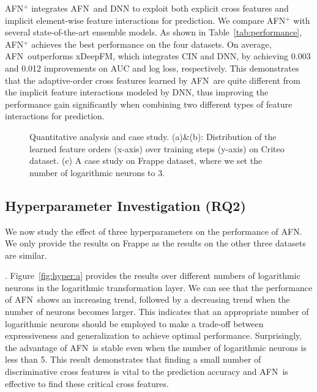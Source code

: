 \documentclass[letterpaper]{article} \usepackage{aaai20}  \usepackage{times}  \usepackage{helvet} \usepackage{courier}  \usepackage[hyphens]{url}  \usepackage{graphicx} \urlstyle{rm} \def\UrlFont{\rm}  \usepackage{graphicx}  \frenchspacing  \setlength{\pdfpagewidth}{8.5in}  \setlength{\pdfpageheight}{11in}
\newcommand{\model}{{AFN}~}
\newcommand{\modelns}{{AFN}}
\begin{document}
\modelns$^+$ integrates \model and DNN to exploit both explicit cross features and implicit element-wise feature interactions for prediction. We compare \modelns$^+$ with several state-of-the-art ensemble models.
As shown in Table~\ref{tab:performance}, \modelns$^+$ achieves the best performance on the four datasets. On average, \model outperforms xDeepFM, which integrates CIN and DNN, by achieving 0.003 and 0.012 improvements on AUC and log loss, respectively. This demonstrates that the adaptive-order cross features learned by \model are quite different from the implicit feature interactions modeled by DNN, thus improving the performance gain significantly when combining two different types of feature interactions for prediction. 

\begin{figure*}
\centering
{}

\parbox[b][\ht\tempbox][s]{.6\columnwidth}{

}\qquad  
{}

\caption{Quantitative analysis and case study. (a)\&(b): Distribution of the learned feature orders (x-axis) over training steps (y-axis) on Criteo dataset. (c) A case study on Frappe dataset, where we set the number of logarithmic neurons to $3$.\label{fig:weights}}
\end{figure*}

\subsection{Hyperparameter Investigation (RQ2)}

We now study the effect of three hyperparameters on the performance of \modelns. We only provide the results on Frappe as the results on the other three datasets are similar.

.
Figure~\ref{fig:hyper:a} provides the results over different numbers of logarithmic neurons in the logarithmic transformation layer. We can see that the performance of \model shows an increasing trend, followed by a decreasing trend when the number of neurons becomes larger. This indicates that an appropriate number of logarithmic neurons should be employed to make a trade-off between expressiveness and generalization to achieve optimal performance. Surprisingly, the advantage of \model is stable even when the number of logarithmic neurons is less than 5. This result demonstrates that finding a small number of discriminative cross features is vital to the prediction accuracy and \model is effective to find these critical cross features.
\end{document}
